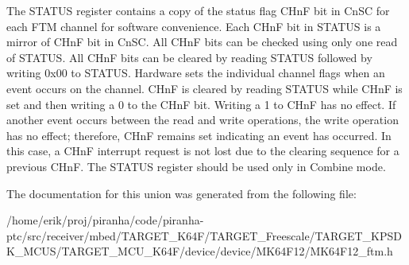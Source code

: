 The S\+T\+A\+T\+US register contains a copy of the status flag C\+HnF bit in Cn\+SC for each F\+TM channel for software convenience. Each C\+HnF bit in S\+T\+A\+T\+US is a mirror of C\+HnF bit in Cn\+SC. All C\+HnF bits can be checked using only one read of S\+T\+A\+T\+US. All C\+HnF bits can be cleared by reading S\+T\+A\+T\+US followed by writing 0x00 to S\+T\+A\+T\+US. Hardware sets the individual channel flags when an event occurs on the channel. C\+HnF is cleared by reading S\+T\+A\+T\+US while C\+HnF is set and then writing a 0 to the C\+HnF bit. Writing a 1 to C\+HnF has no effect. If another event occurs between the read and write operations, the write operation has no effect; therefore, C\+HnF remains set indicating an event has occurred. In this case, a C\+HnF interrupt request is not lost due to the clearing sequence for a previous C\+HnF. The S\+T\+A\+T\+US register should be used only in Combine mode. 

The documentation for this union was generated from the following file\+:\begin{DoxyCompactItemize}
\item 
/home/erik/proj/piranha/code/piranha-\/ptc/src/receiver/mbed/\+T\+A\+R\+G\+E\+T\+\_\+\+K64\+F/\+T\+A\+R\+G\+E\+T\+\_\+\+Freescale/\+T\+A\+R\+G\+E\+T\+\_\+\+K\+P\+S\+D\+K\+\_\+\+M\+C\+U\+S/\+T\+A\+R\+G\+E\+T\+\_\+\+M\+C\+U\+\_\+\+K64\+F/device/device/\+M\+K64\+F12/M\+K64\+F12\+\_\+ftm.\+h\end{DoxyCompactItemize}
